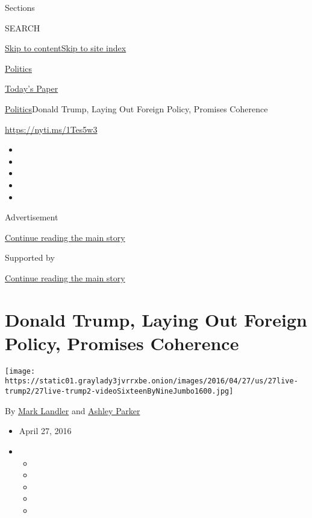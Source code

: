 Sections

SEARCH

\protect\hyperlink{site-content}{Skip to
content}\protect\hyperlink{site-index}{Skip to site index}

\href{https://www.nytimes3xbfgragh.onion/section/politics}{Politics}

\href{https://myaccount.nytimes3xbfgragh.onion/auth/login?response_type=cookie\&client_id=vi}{}

\href{https://www.nytimes3xbfgragh.onion/section/todayspaper}{Today's
Paper}

\href{/section/politics}{Politics}\textbar{}Donald Trump, Laying Out
Foreign Policy, Promises Coherence

\url{https://nyti.ms/1Tes5w3}

\begin{itemize}
\item
\item
\item
\item
\item
\end{itemize}

Advertisement

\protect\hyperlink{after-top}{Continue reading the main story}

Supported by

\protect\hyperlink{after-sponsor}{Continue reading the main story}

\hypertarget{donald-trump-laying-out-foreign-policy-promises-coherence}{%
\section{Donald Trump, Laying Out Foreign Policy, Promises
Coherence}\label{donald-trump-laying-out-foreign-policy-promises-coherence}}

\texttt{[image: https://static01.graylady3jvrrxbe.onion/images/2016/04/27/us/27live-trump2/27live-trump2-videoSixteenByNineJumbo1600.jpg]}

By \href{http://www.nytimes3xbfgragh.onion/by/mark-landler}{Mark
Landler} and
\href{http://www.nytimes3xbfgragh.onion/by/ashley-parker}{Ashley Parker}

\begin{itemize}
\item
  April 27, 2016
\item
  \begin{itemize}
  \item
  \item
  \item
  \item
  \item
  \end{itemize}
\end{itemize}

